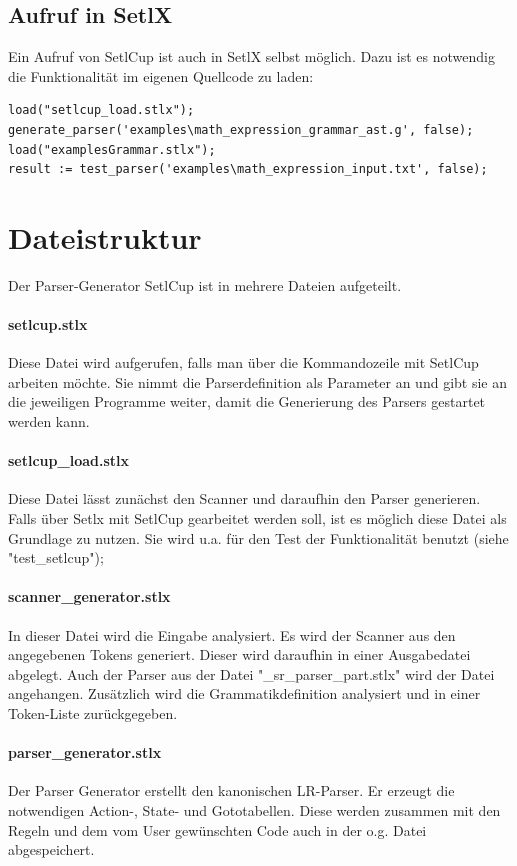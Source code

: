 \subsection{Aufruf in SetlX}
Ein Aufruf von SetlCup ist auch in SetlX selbst möglich. Dazu ist es notwendig die Funktionalität im eigenen Quellcode zu laden:
\begin{Verbatim}
load("setlcup_load.stlx");
generate_parser('examples\math_expression_grammar_ast.g', false);
load("examplesGrammar.stlx");
result := test_parser('examples\math_expression_input.txt', false);
\end{Verbatim}
\section{Dateistruktur}
Der Parser-Generator SetlCup ist in mehrere Dateien aufgeteilt.
\paragraph{setlcup.stlx} Diese Datei wird aufgerufen, falls man über die Kommandozeile mit SetlCup arbeiten möchte. Sie nimmt die Parserdefinition als Parameter an und gibt sie an die jeweiligen Programme weiter, damit die Generierung des Parsers gestartet werden kann.
\paragraph{setlcup\_load.stlx} Diese Datei lässt zunächst den Scanner und daraufhin den Parser generieren. Falls über Setlx mit SetlCup gearbeitet werden soll, ist es möglich diese Datei als Grundlage zu nutzen. Sie wird u.a. für den Test der Funktionalität benutzt (siehe "test\_setlcup");
\paragraph{scanner\_generator.stlx} In dieser Datei wird die Eingabe analysiert. Es wird der Scanner aus den angegebenen Tokens generiert. Dieser wird daraufhin in einer Ausgabedatei abgelegt. Auch der Parser aus der Datei "\_sr\_parser\_part.stlx" wird der Datei angehangen. Zusätzlich wird die Grammatikdefinition analysiert und  in einer Token-Liste zurückgegeben.
\paragraph{parser\_generator.stlx} Der Parser Generator erstellt den kanonischen LR-Parser. Er erzeugt die notwendigen Action-, State- und Gototabellen. Diese werden zusammen mit den Regeln und dem vom User gewünschten Code auch in der o.g. Datei abgespeichert. 
